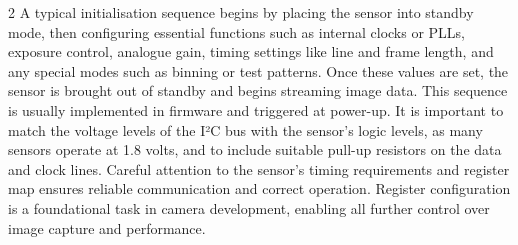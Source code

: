 \documentclass[10pt]{article}
\begin{document}
\begin{multicols}{2}
\newline \newline
A typical initialisation sequence begins by placing the sensor into standby mode, then configuring essential functions such as internal clocks or PLLs, exposure control, analogue gain, timing settings like line and frame length, and any special modes such as binning or test patterns.
Once these values are set, the sensor is brought out of standby and begins streaming image data. This sequence is usually implemented in firmware and triggered at power-up. It is important to match the voltage levels of the I²C bus with the sensor's logic levels, as many sensors operate at 1.8 volts, and to include suitable pull-up resistors on the data and clock lines.
Careful attention to the sensor's timing requirements and register map ensures reliable communication and correct operation. Register configuration is a foundational task in camera development, enabling all further control over image capture and performance.


\end{multicols}
\end{document}
